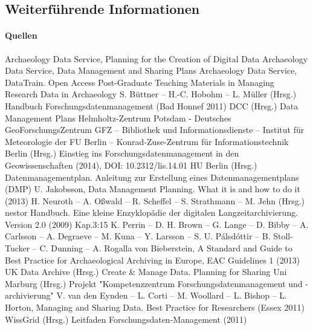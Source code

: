 \subsection{Weiterführende Informationen}
\paragraph{Quellen}
\begin{flushleft}
Archaeology Data Service, Planning for the Creation of Digital Data 
Archaeology Data Service, Data Management and Sharing Plans 
Archaeology Data Service, DataTrain. Open Access Post-Graduate Teaching Materials in Managing Research Data in Archaeology 
S. Büttner --  H.-C. Hobohm -- L. Müller (Hrsg.) Handbuch Forschungsdatenmanagement (Bad Honnef 2011)\abstand
DCC (Hrsg.) Data Management Plans 
Helmholtz-Zentrum Potsdam - Deutsches GeoForschungsZentrum GFZ -- Bibliothek und Informationsdienste -- Institut für Meteorologie der FU Berlin -- Konrad-Zuse-Zentrum für Informationstechnik Berlin (Hrsg.) Einstieg ins Forschungsdatenmanagement in den Geowissenschaften (2014), DOI: 10.2312/lis.14.01 
HU Berlin (Hrsg.)  Datenmanagementplan. Anleitung zur Erstellung eines Datenmanagementplans (DMP) 
U. Jakobsson, Data Management Planning. What it is and how to do it (2013) 
H. Neuroth -- A. Oßwald -- R. Scheffel -- S. Strathmann -- M. Jehn (Hrsg.) nestor Handbuch. Eine kleine Enzyklopädie der digitalen Langzeitarchivierung. Version 2.0 (2009) Kap.3:15 \abstand
K. Perrin -- D. H. Brown -- G. Lange -- D. Bibby -- A. Carlsson -- A. Degraeve -- M. Kuna -- Y. Larsson -- S. U. Pálsdóttir -- B. Stoll-Tucker -- C. Dunning -- A. Rogalla von Bieberstein, A Standard and Guide to Best Practice for Archaeological Archiving in Europe, EAC Guidelines 1 (2013) 
UK Data Archive (Hrsg.) Create \& Manage Data. Planning for Sharing 
Uni Marburg (Hrsg.) Projekt "Kompetenzzentrum Forschungsdatenmanagement und -archivierung" 
V. van den Eynden -- L. Corti -- M. Woollard -- L. Bishop -- L. Horton, Managing and Sharing Data. Best Practice for Researchers (Essex 2011) 
WissGrid (Hrsg.) Leitfaden Forschungsdaten-Management (2011) 


\end{flushleft}
